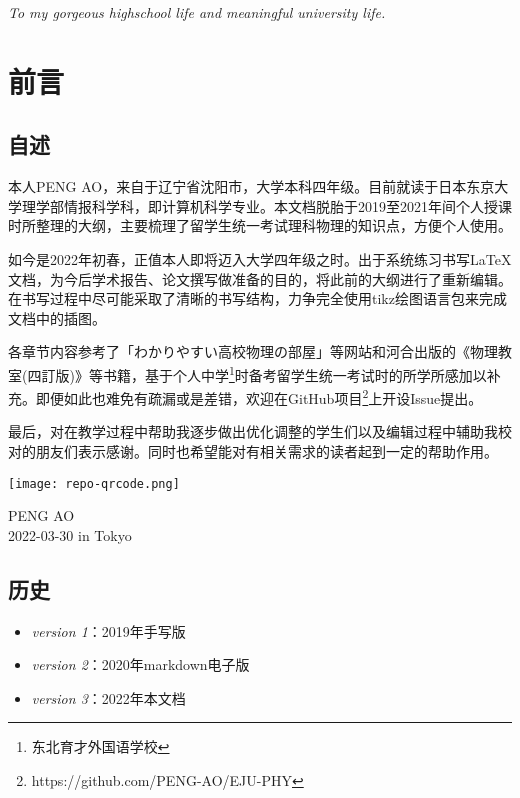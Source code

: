 
\clearpage
\begin{center}
    \null

    \vspace{0.382\textheight}
    \textit{\large
        To my gorgeous highschool life
        and meaningful university life.
    }
\end{center}


\clearpage
\chapter{前言}

\section*{自述}
本人PENG AO，来自于辽宁省沈阳市，大学本科四年级。目前就读于日本东京大学理学部情报科学科，即计算机科学专业。本文档脱胎于2019至2021年间个人授课时所整理的大纲，主要梳理了留学生统一考试理科物理的知识点，方便个人使用。

如今是2022年初春，正值本人即将迈入大学四年级之时。出于系统练习书写\LaTeX 文档，为今后学术报告、论文撰写做准备的目的，将此前的大纲进行了重新编辑。在书写过程中尽可能采取了清晰的书写结构，力争完全使用tikz绘图语言包来完成文档中的插图。

各章节内容参考了「わかりやすい高校物理の部屋」等网站和河合出版的《物理教室(四訂版)》等书籍，基于个人中学\footnote{东北育才外国语学校}时备考留学生统一考试时的所学所感加以补充。即便如此也难免有疏漏或是差错，欢迎在GitHub项目\footnote{https://github.com/PENG-AO/EJU-PHY}上开设Issue提出。

最后，对在教学过程中帮助我逐步做出优化调整的学生们以及编辑过程中辅助我校对的朋友们表示感谢。同时也希望能对有相关需求的读者起到一定的帮助作用。

\begin{center}
    \texttt{[image: repo-qrcode.png]}
\end{center}

\begin{flushright}
    PENG AO\\
    2022-03-30 in Tokyo
\end{flushright}

\section*{历史}
\begin{itemize}
    \item \textit{version 1}：2019年手写版
    \item \textit{version 2}：2020年markdown电子版
    \item \textit{version 3}：2022年本文档
\end{itemize}


